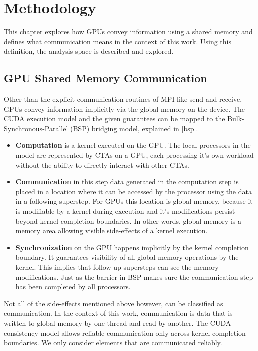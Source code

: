 \chapter{Methodology}
This chapter explores how GPUs convey information using a shared memory and defines what communication means in the context of this work. Using this definition, the analysis space is described and explored.
\section{GPU Shared Memory Communication}
Other than the explicit communication routines of MPI like send and receive, GPUs convey information implicitly via the global memory on the device. 
The CUDA execution model and the given guarantees can be mapped to the Bulk-Synchronous-Parallel (BSP) bridging model, explained in \ref{bsp}.
\begin{itemize}
	\item \textbf{Computation} is a kernel executed on the GPU. The local processors in the model are represented by CTAs on a GPU, each processing it's own workload without the ability to directly
	interact with other CTAs.
	\item \textbf{Communication} in this step data generated in the computation step is placed in a location where it can be accessed by the processor using the data in a following superstep. For GPUs this location is 
	global memory, because it is modifiable by a kernel during execution and it's modifications persist beyond kernel completion boundaries. In other words, global memory is a memory area allowing visible side-effects
	of a kernel execution.
	\item \textbf{Synchronization} on the GPU happens implicitly by the kernel completion boundary. It guarantees visibility of all global memory operations by the kernel. This implies that follow-up supersteps can see the memory modifications. Just as the barrier in BSP makes sure the communication step
	has been completed by all processors.
	
\end{itemize} 
 Not all of the side-effects mentioned above however, can be classified as communication. In the context of this work, communication is data that is written to global memory by one thread and read by another. The CUDA consistency model allows reliable communication only across kernel completion boundaries. We only consider elements that are communicated reliably.

